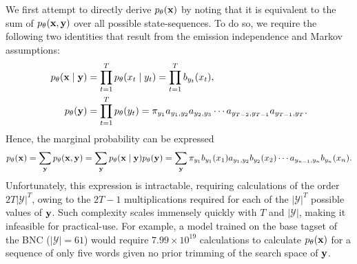 \documentclass[../main.tex]{subfiles}
\begin{document}
We first attempt to directly derive $p_\theta(\mathbf{x})$ by noting that it is equivalent to the sum of $p_\theta(\mathbf{x}, \mathbf{y})$ over all possible state-sequences. To do so, we require the following two identities that result from the emission independence and Markov assumptions:
\begin{align*}
    p_\theta(\mathbf{x} \mid \mathbf{y}) &= \prod_{t=1}^T p_\theta(x_t \mid y_t) = \prod_{t=1}^T b_{y_t}(x_t), \\
    p_\theta(\mathbf{y}) &= \prod_{t=1}^T p_\theta(y_t) = \pi_{y_1} a_{y_1,y_2} a_{y_2,y_3} \cdots a_{y_{T-2},y_{T-1}} a_{y_{T-1},y_T}.
\end{align*}
Hence, the marginal probability can be expressed
\begin{equation*}
    p_\theta(\mathbf{x}) = \sum_{\mathbf{y}} p_\theta(\mathbf{x},\mathbf{y}) = \sum_{\mathbf{y}} p_\theta(\mathbf{x} \mid \mathbf{y}) p_\theta(\mathbf{y}) = \sum_{\mathbf{y}} \pi_{y_1} b_{y_1}(x_1) a_{y_1, y_2} b_{y_2}(x_2) \cdots a_{y_{n-1}, y_n} b_{y_n}(x_n).
\end{equation*}
Unfortunately, this expression is intractable, requiring calculations of the order $2T|\mathcal{Y}|^T$, owing to the $2T - 1$ multiplications required for each of the $|\mathcal{Y}|^T$ possible values of $\mathbf{y}$.
Such complexity scales immensely quickly with $T$ and $|\mathcal{Y}|$, making it infeasible for practical-use. For example, a model trained on the base tagset of the BNC ($|\mathcal{Y}|=61$) \autocite{bnc-corpus} would require $7.99 \times 10^{19}$ calculations to calculate $p_\theta(\mathbf{x})$ for a sequence of only five words given no prior trimming of the search space of $\mathbf{y}$.
\end{document}
